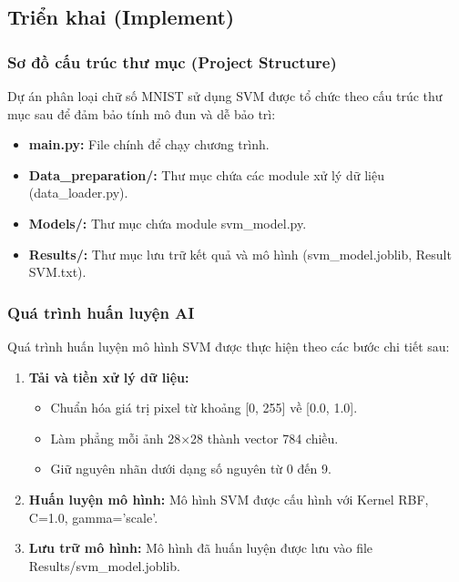 \documentclass[../DoAn.tex]{subfiles}
\begin{document}
\subsection{Triển khai (Implement)}

\subsubsection{Sơ đồ cấu trúc thư mục (Project Structure)}

Dự án phân loại chữ số MNIST sử dụng SVM được tổ chức theo cấu trúc thư mục sau để đảm bảo tính mô đun và dễ bảo trì:

\begin{itemize}
    \item \textbf{main.py:} File chính để chạy chương trình.
    \item \textbf{Data\_preparation/:} Thư mục chứa các module xử lý dữ liệu (data\_loader.py).
    \item \textbf{Models/:} Thư mục chứa module svm\_model.py.
    \item \textbf{Results/:} Thư mục lưu trữ kết quả và mô hình (svm\_model.joblib, Result SVM.txt).\\
\end{itemize}

\subsubsection{Quá trình huấn luyện AI}

Quá trình huấn luyện mô hình SVM được thực hiện theo các bước chi tiết sau:

\begin{enumerate}
    \item \textbf{Tải và tiền xử lý dữ liệu:}
    \begin{itemize}
        \item Chuẩn hóa giá trị pixel từ khoảng [0, 255] về [0.0, 1.0].
        \item Làm phẳng mỗi ảnh 28×28 thành vector 784 chiều.
        \item Giữ nguyên nhãn dưới dạng số nguyên từ 0 đến 9.
    \end{itemize}
    
    \item \textbf{Huấn luyện mô hình:} Mô hình SVM được cấu hình với Kernel RBF, C=1.0, gamma='scale'.
    
    \item \textbf{Lưu trữ mô hình:} Mô hình đã huấn luyện được lưu vào file Results/svm\_model.joblib.
    
\end{enumerate}
\end{document}
